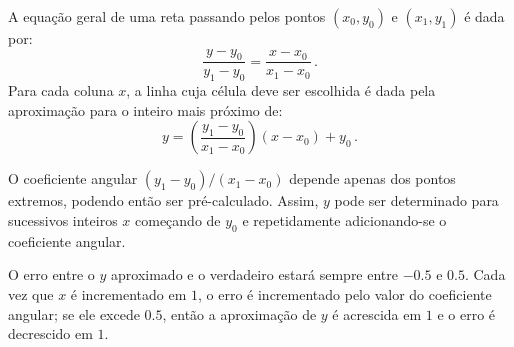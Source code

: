A equação geral de uma reta passando pelos pontos $(x_0,y_0)$ e  $(x_1,y_1)$
é dada por:
\begin{equation*}
\frac{y-y_0}{y_1-y_0}=\frac{x-x_0}{x_1-x_0}\,.
\end{equation*}
Para cada coluna $x$, a linha cuja célula deve ser escolhida é dada pela
aproximação para o inteiro mais próximo de:
\begin{equation*}
y=\left(\frac{y_1-y_0}{x_1-x_0}\right)\left(x-x_0\right) + y_0\,.
\end{equation*}

O coeficiente angular $(y_1-y_0)/(x_1-x_0)$ depende apenas dos pontos
extremos, podendo então ser pré-calculado. Assim, $y$ pode ser determinado para
sucessivos inteiros $x$ começando de $y_0$ e repetidamente adicionando-se o
coeficiente angular.

O erro entre o $y$ aproximado e o verdadeiro estará sempre entre $-0.5$ e
$0.5$. Cada vez que $x$ é incrementado em $1$, o erro é incrementado pelo valor
do coeficiente angular; se ele excede $0.5$, então a aproximação de $y$ é
acrescida em $1$ e o erro é decrescido em $1$.

\nocite{wiki:Bresenham_line}
